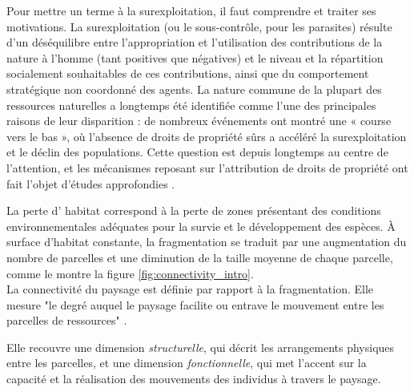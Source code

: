 \begin{displayquote}
\begin{displayquote}
\begin{displayquote}
Pour mettre un terme à la surexploitation, il faut comprendre et traiter ses motivations. La surexploitation (ou le sous-contrôle, pour les parasites) résulte d'un déséquilibre entre l'appropriation et l'utilisation des contributions de la nature à l'homme (tant positives que négatives) et le niveau et la répartition socialement souhaitables de ces contributions, ainsi que du comportement stratégique non coordonné des agents. 	
La nature commune de la plupart des ressources naturelles \citep{Gordon1954, smith_models_1969} a longtemps été identifiée comme l'une des principales raisons de leur disparition : de nombreux événements ont montré une « course vers le bas », où l'absence de droits de propriété sûrs a accéléré la surexploitation et le déclin des populations. Cette question est depuis longtemps au centre de l'attention, et les mécanismes reposant sur l'attribution de droits de propriété ont fait l'objet d'études approfondies \citep{libecap_tragedy_2009, costello_partial_2015, isaksen_tragedy_2019}.


\begin{tcolorbox}[breakable, 
colback =verylightgray, 
colframe=gray!75!black,
title={Box 2 - Habitat Loss, Fragmentation and Connectivity},
fontupper=\small]


\par %
\justifying %

 
  La perte d' habitat correspond à la perte de zones présentant des conditions environnementales adéquates pour la survie et le développement des espèces.     À surface d'habitat constante, la fragmentation se traduit par une augmentation du nombre de parcelles et une diminution de la taille moyenne de chaque parcelle, comme le montre la figure \ref{fig:connectivity_intro}. \\

  La connectivité du paysage est définie par rapport à la fragmentation. Elle mesure "le degré auquel le paysage facilite ou entrave le mouvement entre les parcelles de ressources" \citep{taylor_connectivity_1993}. 

Elle recouvre une dimension \textit{structurelle}, qui décrit les arrangements physiques entre les parcelles, et une dimension \textit{fonctionnelle}, qui met l'accent sur la capacité et la réalisation des mouvements des individus à travers le paysage.


\end{tcolorbox}
\end{displayquote}
\end{displayquote}
\end{displayquote}
